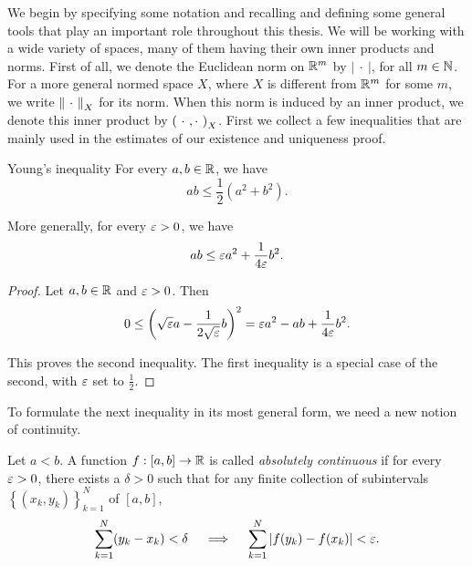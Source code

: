 We begin by specifying some notation and recalling and defining some general tools that play an important role throughout this thesis. We will be working with a wide variety of spaces, many of them having their own inner products and norms. First of all, we denote the Euclidean norm on $\mathbb{R}^m$ by $\left|\ \cdot\ \right|$, for all $m \in \mathbb{N}$. For a more general normed space $X$, where $X$ is different from $\mathbb{R}^m$ for some $m$, we write $\left\| \ \cdot\  \right\|_X$ for its norm. When this norm is induced by an inner product, we denote this inner product by $\inner{\ \cdot\ , \cdot\ }_X$. First we collect a few inequalities that are mainly used in the estimates of our existence and uniqueness proof.
\begin{lemma}{Young's inequality}{}
    For every $a, b \in \mathbb{R}$, we have
%
    \begin{equation*}
        ab \leq \frac{1}{2} \left(a^2 + b^2\right) .
    \end{equation*}

    \noindent
    More generally, for every $\varepsilon > 0$, we have
%
    \begin{equation*}
        ab \leq \varepsilon a^2 + \frac{1}{4 \varepsilon} b^2 .
    \end{equation*}
\end{lemma}

\begin{proof}
    Let $a, b \in \mathbb{R}$ and $\varepsilon > 0$. Then
%
    \begin{equation*}
        0 \leq \left(\sqrt{\varepsilon} a - \frac{1}{2 \sqrt{\varepsilon}} b\right)^2 = \varepsilon a^2 - ab + \frac{1}{4 \varepsilon} b^2 .
    \end{equation*}

    \noindent
    This proves the second inequality. The first inequality is a special case of the second, with $\varepsilon$ set to $\frac{1}{2}$.
\end{proof}

To formulate the next inequality in its most general form, we need a new notion of continuity.

\begin{definition}{}{}
    Let $a < b$. A function $f: [a, b] \to \mathbb{R}$ is called \emph{absolutely continuous} if for every $\varepsilon > 0$, there exists a $\delta > 0$ such that for any finite collection of subintervals $\left\{ (x_k, y_k) \right\}_{k = 1}^{N}$ of $[a, b]$,
%
    \begin{equation*}
        \sum_{k = 1}^{N} (y_k - x_k) < \delta \quad \implies \quad \sum_{k = 1}^{N} \left| f(y_k) - f(x_k) \right| < \varepsilon.
    \end{equation*}
\end{definition}

